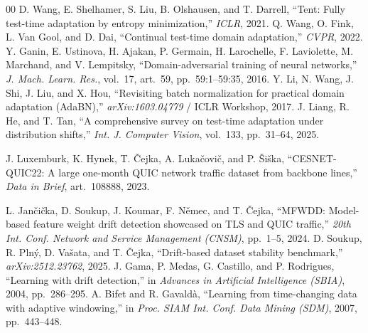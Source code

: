 \begin{thebibliography}{00}
 D. Wang, E. Shelhamer, S. Liu, B. Olshausen, and T. Darrell, ``Tent: Fully test-time adaptation by entropy minimization,'' \textit{ICLR}, 2021.
 Q. Wang, O. Fink, L. Van Gool, and D. Dai, ``Continual test-time domain adaptation,'' \textit{CVPR}, 2022.
 Y. Ganin, E. Ustinova, H. Ajakan, P. Germain, H. Larochelle, F. Laviolette, M. Marchand, and V. Lempitsky, ``Domain-adversarial training of neural networks,'' \textit{J. Mach. Learn. Res.}, vol.~17, art.~59, pp.~59:1--59:35, 2016.
 Y. Li, N. Wang, J. Shi, J. Liu, and X. Hou, ``Revisiting batch normalization for practical domain adaptation (AdaBN),'' \textit{arXiv:1603.04779} / ICLR Workshop, 2017. %
 J. Liang, R. He, and T. Tan, ``A comprehensive survey on test-time adaptation under distribution shifts,'' \textit{Int. J. Computer Vision}, vol.~133, pp.~31--64, 2025.

 J. Luxemburk, K. Hynek, T. \v{C}ejka, A. Luka\v{c}ovi\v{c}, and P. \v{S}i\v{s}ka, ``CESNET-QUIC22: A large one-month QUIC network traffic dataset from backbone lines,'' \textit{Data in Brief}, art.~108888, 2023.

 L. Jan\v{c}i\v{c}ka, D. Soukup, J. Koumar, F. N\v{e}mec, and T. \v{C}ejka, ``MFWDD: Model-based feature weight drift detection showcased on TLS and QUIC traffic,'' \textit{20th Int. Conf. Network and Service Management (CNSM)}, pp.~1--5, 2024.
 D. Soukup, R. Pln\'y, D. Va\v{s}ata, and T. \v{C}ejka, ``Drift-based dataset stability benchmark,'' \textit{arXiv:2512.23762}, 2025.
 J. Gama, P. Medas, G. Castillo, and P. Rodrigues, ``Learning with drift detection,'' in \textit{Advances in Artificial Intelligence (SBIA)}, 2004, pp.~286--295.
 A. Bifet and R. Gavald\`a, ``Learning from time-changing data with adaptive windowing,'' in \textit{Proc. SIAM Int. Conf. Data Mining (SDM)}, 2007, pp.~443--448.


\end{thebibliography}
